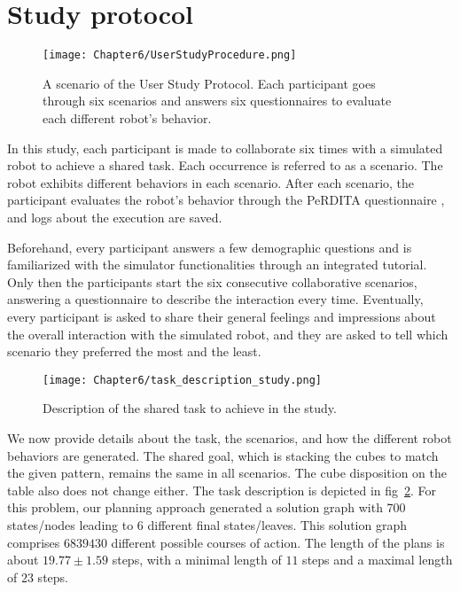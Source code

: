 \section{Study protocol} \label{sec:study_protocol}

\begin{figure}
    \centering
    \texttt{[image: Chapter6/UserStudyProcedure.png]}
    \caption{A scenario of the User Study Protocol. Each participant goes through six scenarios and answers six questionnaires to evaluate each different robot's behavior.}
    \label{fig:user_study_protocol}
\end{figure}


In this study, each participant is made to collaborate six times with a simulated robot to achieve a shared task. Each occurrence is referred to as a scenario. The robot exhibits different behaviors in each scenario. After each scenario, the participant evaluates the robot's behavior through the PeRDITA questionnaire \cite{devin_evaluating_2018}, and logs about the execution are saved.

Beforehand, every participant answers a few demographic questions and is familiarized with the simulator functionalities through an integrated tutorial. Only then the participants start the six consecutive collaborative scenarios, answering a questionnaire to describe the interaction every time. Eventually, every participant is asked to share their general feelings and impressions about the overall interaction with the simulated robot, and they are asked to tell which scenario they preferred the most and the least.

\begin{figure}
    \centering
    \texttt{[image: Chapter6/task\_description\_study.png]}
    \caption{Description of the shared task to achieve in the study.}
    \label{fig:task_description_study}
\end{figure}

We now provide details about the task, the scenarios, and how the different robot behaviors are generated. 
The shared goal, which is stacking the cubes to match the given pattern, remains the same in all scenarios. The cube disposition on the table also does not change either. The task description is depicted in fig~\ref{fig:task_description_study}. For this problem, our planning approach generated a solution graph with 700 states/nodes leading to 6 different final states/leaves. This solution graph comprises $6839430$ different possible courses of action. The length of the plans is about $19.77 \pm 1.59$ steps, with a minimal length of $11$ steps and a maximal length of $23$ steps.

